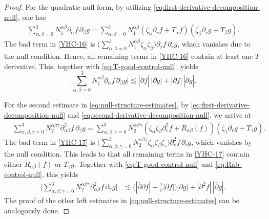 \documentclass[11pt,twoside]{article}
\def\ds{\displaystyle}
\theoremstyle{plain}
\theoremstyle{definition}
\theoremstyle{assumption}
\numberwithin{equation}{section}
\begin{document}
\begin{proof}
	For the quadratic null form, by utilizing \eqref{eq:first-derivative-decomposition-null}, one has
		\begin{equation}\label{YHC-16}
			\begin{aligned}
				\sum_{\alpha,\beta=0}^3
				N_1^{\alpha\beta}\partial_\alpha f\,\partial_\beta g
				=
				\sum_{\alpha,\beta=0}^3
				N_1^{\alpha\beta}
				(\zeta_\alpha\partial_r f+T_\alpha f)
				(\zeta_\beta\partial_r g+T_\beta g).
			\end{aligned}
		\end{equation}
		The bad term in \eqref{YHC-16} is
		$\big(
		\ds\sum_{\alpha,\beta=0}^3
		N_1^{\alpha\beta}\zeta_\alpha\zeta_\beta
		\big)
		\partial_r f\,\partial_r g$,
		which vanishes due to the null condition. Hence, all remaining terms in \eqref{YHC-16} contain at least
		one $T$ derivative. This, together with \eqref{eq:T-good-control-null}, yields
		\begin{equation*}
			\big|
			\sum_{\alpha,\beta=0}^3
			N_1^{\alpha\beta}\partial_\alpha f\,\partial_\beta g
			\big|
			\lesssim
			|\bar\partial f|\,|\partial g|
			+
			|\partial f|\,|\bar\partial g|.
		\end{equation*}
		
		For the second estimate in \eqref{eq:null-structure-estimates}, by
		\eqref{eq:first-derivative-decomposition-null} and
		\eqref{eq:second-derivative-decomposition-null}, we arrive at
		\begin{equation}\label{YHC-17}
			\begin{aligned}
				&\sum_{\alpha,\beta,\gamma=0}^3
				N_2^{\alpha\beta\gamma}
				\partial_{\alpha\beta}^2f\,\partial_\gamma g
				=
				\sum_{\alpha,\beta,\gamma=0}^3
				N_2^{\alpha\beta\gamma}
				\left(
				\zeta_\alpha\zeta_\beta\partial_r^2f
				+
				R_{\alpha\beta}(f)
				\right)
				\left(
				\zeta_\gamma\partial_r g+T_\gamma g
				\right).
			\end{aligned}
		\end{equation}
		The bad term in \eqref{YHC-17} is
		$\big(
		\sum_{\alpha,\beta,\gamma=0}^3
		N_2^{\alpha\beta\gamma}
		\zeta_\alpha\zeta_\beta\zeta_\gamma
		\big)
		\partial_r^2f\,\partial_rg$,
		which vanishes by the null condition. This leads to that all remaining terms in \eqref{YHC-17} contain
		either $R_{\alpha\beta}(f)$ or $T_\gamma g$. Together with
		\eqref{eq:T-good-control-null} and \eqref{eq:Rab-control-null}, this yields
		\begin{equation*}
			\begin{aligned}
				\big|
				\sum_{\alpha,\beta,\gamma=0}^3
				N_2^{\alpha\beta\gamma}
				\partial_{\alpha\beta}^2f\,\partial_\gamma g
				\big|
				&\lesssim
				\big(
				|\bar\partial\partial f|
				+
				\frac1r|\partial f|
				\big)
				|\partial g|
				+
				|\partial^2 f|\,|\bar\partial g|.
			\end{aligned}
		\end{equation*}
		The proof of the other left estimates in \eqref{eq:null-structure-estimates} can be analogously done.
	\end{proof}
	
\end{document}
